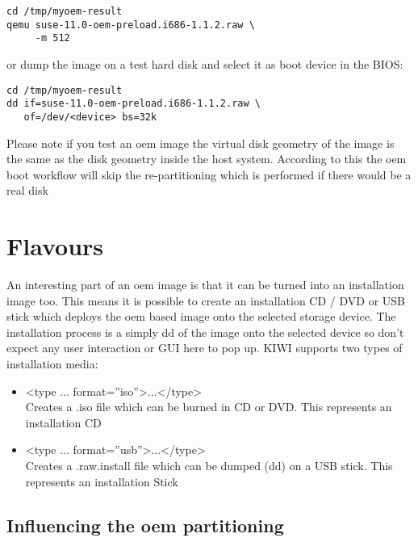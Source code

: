 \begin{Command}{12cm}
\begin{verbatim}
cd /tmp/myoem-result
qemu suse-11.0-oem-preload.i686-1.1.2.raw \
     -m 512
\end{verbatim}
\end{Command}

or dump the image on a test hard disk and select it as boot device
in the BIOS:

\begin{Command}{12cm}
\begin{verbatim}
cd /tmp/myoem-result
dd if=suse-11.0-oem-preload.i686-1.1.2.raw \
   of=/dev/<device> bs=32k
\end{verbatim}
\end{Command}

Please note if you test an oem image the virtual disk geometry of the
image is the same as the disk geometry inside the host system. According
to this the oem boot workflow will skip the re-partitioning which is
performed if there would be a real disk

\section{Flavours}

An interesting part of an oem image is that it can be turned into
an installation image too. This means it is possible to create an
installation CD / DVD or USB stick which deploys the oem based
image onto the selected storage device. The installation process
is a simply dd of the image onto the selected device so don't
expect any user interaction or GUI here to pop up. KIWI supports
two types of installation media:

\begin{itemize}
\item <type ... format=''iso''>...</type>\\
      Creates a .iso file which can be burned in CD or DVD. This
      represents an installation CD
\item <type ... format=''usb''>...</type>\\
      Creates a .raw.install file which can be dumped (dd) on a
      USB stick. This represents an installation Stick
\end{itemize}

\subsection{Influencing the oem partitioning}

